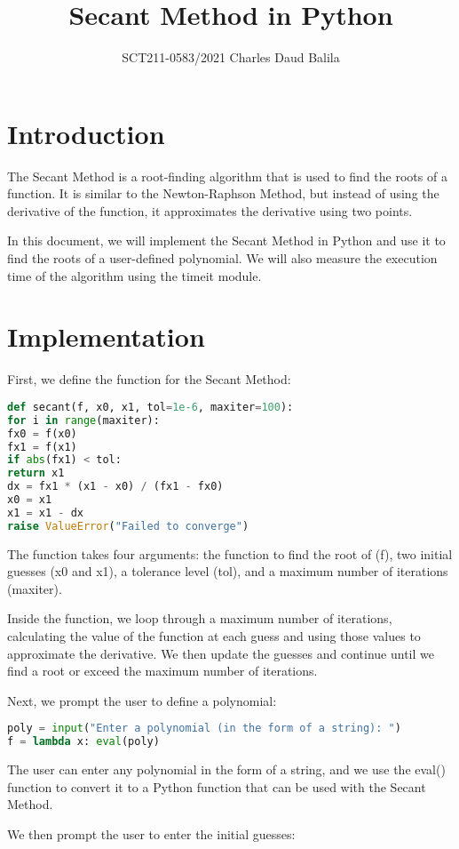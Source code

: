\documentclass{article}
\title{Secant Method in Python}
\author{SCT211-0583/2021 Charles Daud Balila}
\date{}
\begin{document}
\section{Introduction}

The Secant Method is a root-finding algorithm that is used to find the roots of a function. It is similar to the Newton-Raphson Method, but instead of using the derivative of the function, it approximates the derivative using two points.

In this document, we will implement the Secant Method in Python and use it to find the roots of a user-defined polynomial. We will also measure the execution time of the algorithm using the timeit module.

\section{Implementation}

First, we define the function for the Secant Method:

\begin{lstlisting}[language=Python]
def secant(f, x0, x1, tol=1e-6, maxiter=100):
for i in range(maxiter):
fx0 = f(x0)
fx1 = f(x1)
if abs(fx1) < tol:
return x1
dx = fx1 * (x1 - x0) / (fx1 - fx0)
x0 = x1
x1 = x1 - dx
raise ValueError("Failed to converge")
\end{lstlisting}

The function takes four arguments: the function to find the root of (f), two initial guesses (x0 and x1), a tolerance level (tol), and a maximum number of iterations (maxiter).

Inside the function, we loop through a maximum number of iterations, calculating the value of the function at each guess and using those values to approximate the derivative. We then update the guesses and continue until we find a root or exceed the maximum number of iterations.

Next, we prompt the user to define a polynomial:

\begin{lstlisting}[language=Python]
poly = input("Enter a polynomial (in the form of a string): ")
f = lambda x: eval(poly)
\end{lstlisting}

The user can enter any polynomial in the form of a string, and we use the eval() function to convert it to a Python function that can be used with the Secant Method.

We then prompt the user to enter the initial guesses:
\end{document}
